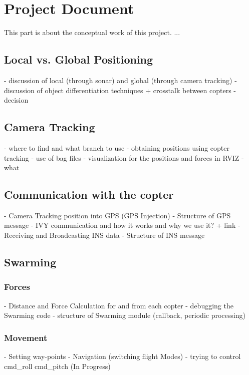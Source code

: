 \chapter{Project Document}\label{ch:ch2label}

This part is about the conceptual work of this project. ...

\section{Local vs. Global Positioning}
- discussion of local (through sonar) and global (through camera tracking) 
- discussion of object differentiation techniques + crosstalk between copters
- decision 

\section{Camera Tracking}
- where to find and what branch to use
- obtaining positions using copter tracking
- use of bag files
- visualization for the positions and forces in RVIZ
- what 

\section{Communication with the copter}
- Camera Tracking position into GPS (GPS Injection)
- Structure of GPS message
- IVY communication and how it works and why we use it? + link
- Receiving and Broadcasting INS data
- Structure of INS message 

\section{Swarming}

\subsection{Forces}
- Distance and Force Calculation for and from each copter
- debugging the Swarming code
- structure of Swarming module (callback, periodic processing)

\subsection{Movement}
- Setting way-points
- Navigation (switching flight Modes)
- trying to control cmd\_roll cmd\_pitch (In Progress) 
